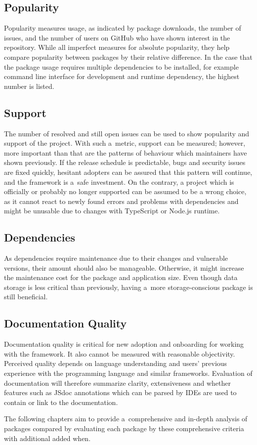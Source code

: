 \subsection{Popularity}

Popularity measures usage, as indicated by package downloads, the number of
issues, and the number of users on GitHub who have shown interest in the
repository. While all imperfect measures for absolute popularity, they help
compare popularity between packages by their relative difference. In the case
that the package usage requires multiple dependencies to be installed, for
example command line interface for development and runtime dependency, the
highest number is listed.

\subsection{Support}

The number of resolved and still open issues can be used to show popularity and
support of the project. With such a~metric, support can be measured; however,
more important than that are the patterns of behaviour which maintainers have
shown previously. If the release schedule is predictable, bugs and security
issues are fixed quickly, hesitant adopters can be assured that this pattern
will continue, and the framework is a~safe investment. On the contrary, a
project which is officially or probably no longer supported can be assumed to be
a wrong choice, as it cannot react to newly found errors and problems with
dependencies and might be unusable due to changes with TypeScript or Node.js
runtime.

\subsection{Dependencies}

As dependencies require maintenance due to their changes and vulnerable
versions, their amount should also be manageable. Otherwise, it might increase
the maintenance cost for the package and application size. Even though data
storage is less critical than previously, having a~more storage-conscious
package is still beneficial.

\subsection{Documentation Quality}

Documentation quality is critical for new adoption and onboarding for working
with the framework. It also cannot be measured with reasonable objectivity.
Perceived quality depends on language understanding and users’ previous
experience with the programming language and similar frameworks. Evaluation of
documentation will therefore summarize clarity, extensiveness and whether
features such as JSdoc annotations \cite{Typescript-jsdoc} which can be parsed
by IDEs are used to contain or link to the documentation.


The following chapters aim to provide a~comprehensive and in-depth analysis of
packages compared by evaluating each package by these comprehensive criteria
with additional added when.
